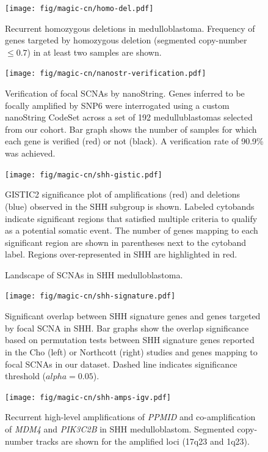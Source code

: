 \documentclass[11pt,letterpaper]{article}
\theoremstyle{definition}
\begin{document}
\begin{figure}
	\centering
	\texttt{[image: fig/magic-cn/homo-del.pdf]}
	\caption{Recurrent homozygous deletions in medulloblastoma. Frequency of genes targeted by homozygous deletion (segmented copy-number $\leq 0.7$) in at least two samples are shown.}
	\label{fig:homo-del}
\end{figure}

\begin{figure}
	\centering
	\texttt{[image: fig/magic-cn/nanostr-verification.pdf]}
	\caption{Verification of focal SCNAs by nanoString.
	Genes inferred to be focally amplified by SNP6 were interrogated using a custom nanoString CodeSet across a set of 192 medullublastomas selected from our cohort. Bar graph shows the number of samples for which each gene is verified (red) or not (black). A verification rate of 90.9\% was achieved.}
	\label{fig:nanostr-verification}
\end{figure}

\clearpage

\begin{figure}[h]
	\begin{center}
		\texttt{[image: fig/magic-cn/shh-gistic.pdf]}
	\end{center}
	\caption{Landscape of SCNAs in SHH medulloblastoma.}
	GISTIC2 significance plot of amplifications (red) and deletions (blue) observed in the SHH subgroup is shown.
	Labeled cytobands indicate significant regions that satisfied multiple criteria to qualify as a potential somatic event. The number of genes mapping to each significant region are shown in parentheses next to the cytoband label.  Regions over-represented in SHH are highlighted in red.
	\label{fig:shh-gistic}
\end{figure}

\clearpage

\begin{figure}
	\centering
	\texttt{[image: fig/magic-cn/shh-signature.pdf]}
	\caption{Significant overlap between SHH signature genes and genes targeted by focal SCNA in SHH.
		Bar graphs show the overlap significance based on permutation tests between SHH signature genes reported in the Cho (left) or Northcott (right) studies and genes mapping to focal SCNAs in our dataset. Dashed line indicates significance threshold ($alpha = 0.05$).}
	\label{fig:shh-signature}
\end{figure}

\begin{figure}
	\centering
	\texttt{[image: fig/magic-cn/shh-amps-igv.pdf]}
	\caption{Recurrent high-level amplifications of \emph{PPMID} and co-amplification of \emph{MDM4} and \emph{PIK3C2B} in SHH medulloblastom.
	Segmented copy-number tracks are shown for the amplified loci (17q23 and 1q23).}
	\label{fig:shh-amps-igv}
\end{figure}
\end{document}
